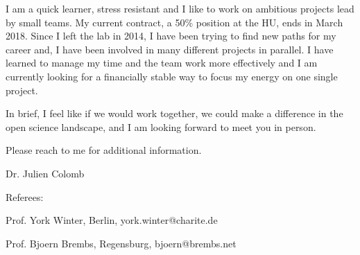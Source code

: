
I am  a quick learner, stress resistant and I like to work on ambitious projects lead by small teams. My current contract, a 50\% position at the HU, ends in March 2018. 
Since I left the lab in 2014, I have been trying to find new paths for my career and,
 I have been involved in many different projects in parallel. I have learned to manage my time and the team work more effectively and I am currently looking for a financially stable way to focus my energy on one single project. 

In brief, I feel like if we would work together, we could make a difference in the open science landscape,
and I am looking forward to meet you in person.

Please reach to me for additional information.

Dr. Julien Colomb


\vspace {1.cm} 

Referees:

Prof. York Winter, Berlin, york.winter@charite.de
 
 
Prof. Bjoern Brembs, Regensburg, bjoern@brembs.net
